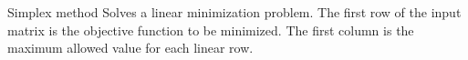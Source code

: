 \begin{algorithm}{Simplex method}
\desc
Solves a linear minimization problem. The first row of the
input matrix is the objective function to be minimized. The
first column is the maximum allowed value for each linear row.
\end{algorithm}




